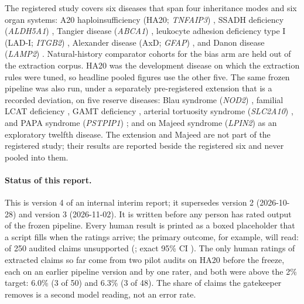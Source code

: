 \documentclass{article} %
\begin{document}
The registered study covers six diseases that span four inheritance modes and six organ systems: A20 haploinsufficiency (HA20; \emph{TNFAIP3}) \citep{zhou2016_ha20_original,aeschlimann2018_ha20_cohort,elhani2024_ha20_177,genereviews_ha20,li2026_ha20_howitreat,he2026_ha20_multicenter}, SSADH deficiency (\emph{ALDH5A1}) \citep{pearl2003_ssadh_series,didiasova2020_ssadh_update,tokatlylatzer2023_ssadh_genotype,tokatlylatzer2024_ssadh_guidelines,genereviews_ssadh}, Tangier disease (\emph{ABCA1}) \citep{puntoni2012_tangier,schaefer2016_hdl_deficiency,mercan2018_tangier_neuropathy,genereviews_tangier,koseki2021_tangier_review}, leukocyte adhesion deficiency type I (LAD-I; \emph{ITGB2}) \citep{qasim2009_lad_hsct,almarzanovoa2018_lad1_review,kambli2020_lad_india,booth2025_lad_gene_therapy}, Alexander disease (AxD; \emph{GFAP}) \citep{prust2011_axd_onset,genereviews_axd,grossi2024_axd_meta,messing2025_axd_14variants}, and Danon disease (\emph{LAMP2}) \citep{sugie2018_danon_japan,brambatti2019_danon_gender,cenacchi2020_danon_review,genereviews_danon,sugie2024_danon_history}. Natural-history comparator cohorts for the bias arm \citep{mura2021_axd_italian,gagliardi2024_axd_ukb,dibacco2019_ssadh_natural_history,boucek2011_danon_natural_history,khedro2025_danon_prospective} are held out of the extraction corpus. HA20 was the development disease on which the extraction rules were tuned, so headline pooled figures use the other five. The same frozen pipeline was also run, under a separately pre-registered extension that is a recorded deviation, on five reserve diseases: Blau syndrome (\emph{NOD2}) \citep{wouters2014_blau,rose2015_blau_cohort,wang2025_blau_review}, familial LCAT deficiency \citep{vitali2022_lcat}, GAMT deficiency \citep{stockleripsiroglu2014_gamt,biagiotti2025_gamt_review}, arterial tortuosity syndrome (\emph{SLC2A10}) \citep{beyens2018_ats}, and PAPA syndrome (\emph{PSTPIP1}) \citep{genovese2020_papa_spectrum,hajialigol2022_papa,satoh2024_pg_genetics}; and on Majeed syndrome (\emph{LPIN2}) \citep{ferguson2021_majeed} as an exploratory twelfth disease. The extension and Majeed are not part of the registered study; their results are reported beside the registered six and never pooled into them.

\paragraph{Status of this report.} This is version 4 of an internal interim report; it supersedes version 2 (2026-10-28) and version 3 (2026-11-02). It is written before any person has rated output of the frozen pipeline. Every human result is printed as a boxed placeholder that a script fills when the ratings arrive; the primary outcome, for example, will read:  of 250 audited claims unsupported (; exact 95\% CI ). The only human ratings of extracted claims so far come from two pilot audits on HA20 before the freeze, each on an earlier pipeline version and by one rater, and both were above the 2\% target: 6.0\% (3 of 50) and 6.3\% (3 of 48). The share of claims the gatekeeper removes is a second model reading, not an error rate.
\end{document}
